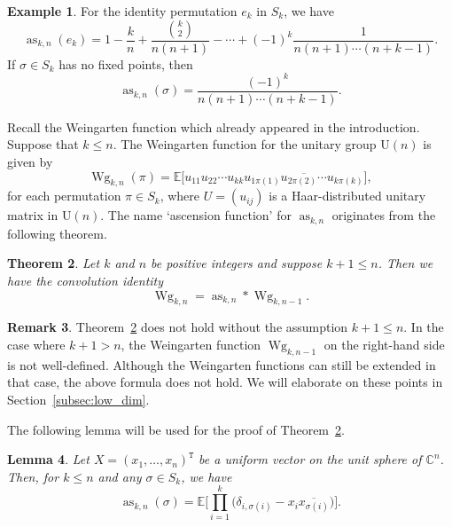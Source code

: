 \documentclass[10pt,a4paper]{amsart}
\numberwithin{equation}{section}
\newtheorem{Theorem}{Theorem}[section]
\newtheorem{Lemma}[Theorem]{Lemma}
\theoremstyle{definition}
\newtheorem{Example}[Theorem]{Example}
\newtheorem{Remark}[Theorem]{Remark}
\newcommand{\UU}{\mathrm{U}}
\newcommand{\trans}[1]{#1^{\mathtt{T}}}
\DeclareMathOperator{\Raise}{as}
\DeclareMathOperator{\Wg}{Wg}
\begin{document}
\begin{Example}
For the identity permutation $e_k$ in $S_k$, we have
\[
\Raise_{k,n}(e_k)
= 1-\frac{k}{n} + \frac{\binom{k}{2}}{n(n+1)} - \cdots +(-1)^k \frac{1}{n(n+1) \cdots(n+k-1)}.
\]
If $\sigma \in S_k$ has no fixed points, then
\[
\Raise_{k,n}(\sigma)= \frac{(-1)^k}{n(n+1) \cdots (n+k-1)}.
\]
\end{Example}


Recall the Weingarten function which already appeared in the introduction. Suppose that $k \le n$.
The Weingarten function for the unitary group $\UU(n)$ is given by
\[
\Wg_{k,n}(\pi) = \mathbb{E}\bigl[ u_{11} u_{22} \cdots u_{kk}
\overline{u_{1\pi(1)} u_{2\pi(2)} \cdots u_{k\pi(k)}}\bigr],
\]
for each permutation $\pi\in S_k$,
where $U=(u_{ij})$ is a Haar-distributed unitary matrix in $\UU(n)$.
The name `ascension function' for $\Raise_{k,n}$ originates from the following theorem.


\begin{Theorem} \label{thm:recursive}
Let $k$ and $n$ be positive integers and suppose $k+1 \le n$.
Then we have the convolution identity
\[
\Wg_{k,n} =\Raise_{k,n} * \Wg_{k,n-1}.
\]
\end{Theorem}


\begin{Remark}
Theorem~\ref{thm:recursive} does not hold without the assumption $k+1 \le n$. In the case where $k+1 > n$, the Weingarten function $\Wg_{k,n-1}$ on the right-hand side is not well-defined. %
Although the Weingarten functions can still be extended in that case, the above formula does not hold.
We will elaborate on these points in Section~\ref{subsec:low_dim}.
\end{Remark}

The following lemma will be used for the proof of Theorem~\ref{thm:recursive}.


\begin{Lemma} \label{lem:expression_A}
Let $X=\trans{(x_1,\dots,x_n)}$ be a uniform vector on the unit sphere of $\mathbb{C}^n$.
Then, for $k \le n$ and any $\sigma \in S_k$, we have
\[
\Raise_{k,n}(\sigma)=\mathbb{E} \Biggl[
\prod_{i=1}^k \bigl( \delta_{i,\sigma(i)} - x_i \overline{x_{\sigma(i)}} \bigr) \Biggr].
\]
\end{Lemma}
\end{document}
